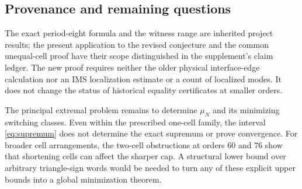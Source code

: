 \subsection{Provenance and remaining questions}

The exact period-eight formula and the witness range are inherited
project results; the present application to the revised conjecture and the
common unequal-cell proof have their scope distinguished in the supplement's
claim ledger. The new proof requires neither the older physical
interface-edge calculation nor an IMS localization estimate or a count of
localized modes. It does not change the status of historical equality
certificates at smaller orders.

The principal extremal problem remains to determine $\mu_N$ and its
minimizing switching classes. Even within the prescribed one-cell family,
the interval \eqref{eq:supremum} does not determine the exact supremum or
prove convergence. For broader cell arrangements, the two-cell
obstructions at orders $60$ and $76$ show that shortening cells can affect
the sharper cap. A structural lower bound over arbitrary triangle-sign
words would be needed to turn any of these explicit upper bounds into a
global minimization theorem.
